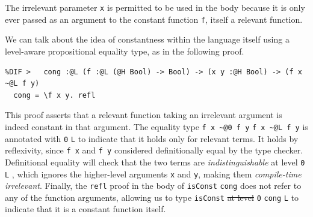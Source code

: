 \documentclass[acmsmall, screen=true, nonacm=true,
  review=\ifpublic false\else true\fi,
  anonymous=\ifanonymous true\else false\fi
]{acmart}
\providecommand{\DIFadd}[1]{{\protect\color{blue}\uwave{#1}}} %
\providecommand{\DIFdel}[1]{{\protect\color{red}\sout{#1}}}                      %
\providecommand{\DIFaddbegin}{} %
\providecommand{\DIFaddend}{} %
\providecommand{\DIFdelbegin}{} %
\providecommand{\DIFdelend}{} %
\providecommand{\DIFmodbegin}{} %
\providecommand{\DIFmodend}{} %
\begin{document}
The irrelevant parameter \lstinline{x} is permitted to be used in the body
because it is only ever passed as an argument to the constant function \lstinline{f},
itself a relevant function.

We can talk about the idea of constantness within the language itself
using a level-aware propositional equality type, as in the following proof.

\DIFmodbegin
\begin{lstlisting}[alsolanguage=DIFcode]
%DIF <   cong :@0 (f :@0 (@1 Bool) -> Bool) -> (x y :@1 Bool) -> (f x ~@0 f y)
%DIF >   cong :@L (f :@L (@H Bool) -> Bool) -> (x y :@H Bool) -> (f x ~@L f y)
  cong = \f x y. refl
\end{lstlisting}
\DIFmodend

This proof asserts that a relevant function taking an irrelevant argument
is indeed constant in that argument.
The equality type \DIFdelbegin %
{\color{red}%
\lstinline{f x ~@0 f y} %
}%
\DIFdelend \DIFaddbegin {\color{blue}%
\lstinline{f x ~@L f y} %
}%
\DIFaddend is annotated with \DIFdelbegin %
{\color{red}%
\lstinline{0}
}%
\DIFdelend \DIFaddbegin {\color{blue}%
\lstinline{L}
%
}%
\DIFaddend to indicate that it holds only for relevant terms.
It holds by reflexivity, since \lstinline{f x} and \lstinline{f y}
\DIFaddbegin \DIFadd{are }\DIFaddend considered definitionally equal by the type checker.
Definitional equality will check that the two terms are
\emph{indistinguishable} at level \DIFdelbegin %
{\color{red}%
\lstinline{0}%
}%
\DIFdelend \DIFaddbegin {\color{blue}%
\lstinline{L}%
}%
\DIFaddend ,
which ignores the higher-level arguments \lstinline{x} and \lstinline{y},
making them \emph{compile-time irrelevant}.
Finally, the \lstinline{refl}
proof in the body of \DIFdelbegin %
{\color{red}%
\lstinline{isConst} %
}%
\DIFdelend \DIFaddbegin {\color{blue}%
\lstinline{cong} %
}%
\DIFaddend does not refer to any of the
function arguments, allowing us to type \DIFdelbegin %
{\color{red}%
\lstinline{isConst} %
}%
\DIFdel{at level
}%
{\color{red}%
\lstinline{0} %
}%
\DIFdelend \DIFaddbegin {\color{blue}%
\lstinline{cong} %
}%
\DIFadd{at level
}{\color{blue}%
\lstinline{L} %
}%
\DIFaddend to indicate that it is a constant function itself.
\end{document}
